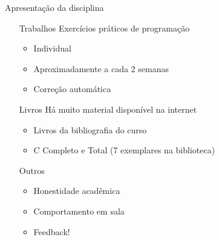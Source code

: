 \documentclass{beamer}
\begin{document}
  \begin{frame}{Apresentação da disciplina}
  	\begin{itemize}
	  	\item[Trabalhos] Exercícios práticos de programação
		  	\begin{itemize}
		  		\item Individual
		  		\item Aproximadamente a cada 2 semanas
		  		\item Correção automática
		  	\end{itemize}
		\item[Livros] Há muito material disponível na internet
			\begin{itemize}
				\item Livros da bibliografia do curso
				\item C Completo e Total (7 exemplares na biblioteca)
			\end{itemize}
		\item[Outros]
			\begin{itemize}
				\item Honestidade acadêmica
				\item Comportamento em sala
				\item Feedback!
			\end{itemize}
	\end{itemize}
  \end{frame}
  
\end{document}
